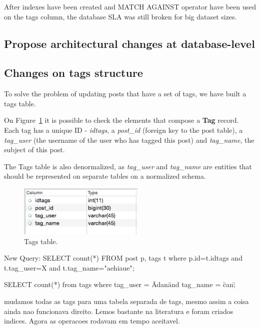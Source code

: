 After indexes have been created and MATCH AGAINST operator have been used on the tags column, the database SLA was still broken for big dataset sizes. 
















\clearpage
\subsection{Propose architectural changes at database-level}

\subsection{Changes on tags structure}
To solve the problem of updating posts that have a set of tags, we have built a tags table. 

On Figure~\ref{fig:tagTable} it is possible to check the elements that compose a \textbf{Tag} record. Each tag has a unique ID - \textit{idtags}, a \textit{post\_id} (foreign key to the post table), a \textit{tag\_user} (the username of the user who has tagged this post) and \textit{tag\_name}, the subject of this post. 

The Tags table is also denormalized, as \textit{tag\_user} and \textit{tag\_name} are entities that should be represented on separate tables on a normalized schema.

\begin{figure}[ht!]
\centering
\includegraphics[width=60mm]{tagTable.png}
\caption{Tags table.\label{fig:tagTable}}
\end{figure}

New Query: 
SELECT count(*) FROM post p, tags t where p.id=t.idtags and t.tag\_user=X and t.tag\_name="aehiaue";

SELECT count(*) from tags where tag\_user = \"Adan\" and tag\_name = \"can\";



	mudamos todas as tags para uma tabela separada de tags, mesmo assim a coisa ainda nao funcionava direito. 
	Lemos bastante na literatura e foram criados indices. 
	Agora as operacoes rodavam em tempo aceitavel.


